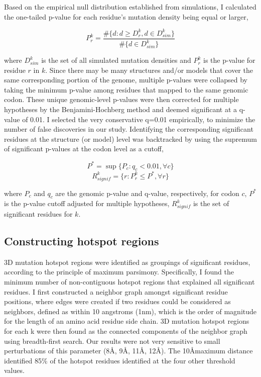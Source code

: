 Based on the empirical null distribution established from simulations, I calculated the one-tailed p-value for each residue's mutation density being equal or larger,

\begin{equation}
P^k_r = \frac{\#\{d : d \geq D^k_r, d \in D^k_{sim}\}}{\#\{d \in D^k_{sim}\}}
\end{equation}

where $D_{sim}^k$ is the set of all simulated mutation densities and $P_r^k$ is the p-value for residue $r$ in $k$. Since there may be many structures and/or models that cover the same corresponding portion of the genome, multiple p-values were collapsed by taking the minimum p-value among residues that mapped to the same genomic codon. These unique genomic-level p-values were then corrected for multiple hypotheses by the Benjamini-Hochberg method \cite{RN94} and deemed significant at a q-value of 0.01. I selected the very conservative q=0.01 empirically, to minimize the number of false discoveries in our study.  Identifying the corresponding significant residues at the structure (or model) level was backtracked by using the supremum of significant p-values at the codon level as a cutoff,

\begin{equation}
P^* = \sup{\{P_c : q_c < 0.01, \forall c\}}
\end{equation}
\begin{equation}
R^k_{signif} = \{r : P^k_r \leq P^*, \forall r\}
\end{equation}

where $P_c$ and $q_c$ are the genomic p-value and q-value, respectively, for codon $c$, $P^*$ is the p-value cutoff adjusted for multiple hypotheses, $R_{signif}^k$ is the set of significant residues for $k$.

\subsection{Constructing hotspot regions}

3D mutation hotspot regions were identified as groupings of significant residues, according to the principle of maximum parsimony.  Specifically, I found the minimum number of non-contiguous hotspot regions that explained all significant residues. I first constructed a neighbor graph amongst significant residue positions, where edges were created if two residues could be considered as neighbors, defined as within 10 angstroms (1nm), which is the order of magnitude for the length of an amino acid residue side chain. 3D mutation hotspot regions for each k were then found as the connected components of the neighbor graph using breadth-first search. Our results were not very sensitive to small perturbations of this parameter (8\AA, 9\AA, 11\AA, 12\AA). The 10\AA maximum distance identified 85\% of the hotspot residues identified at the four other threshold values.


